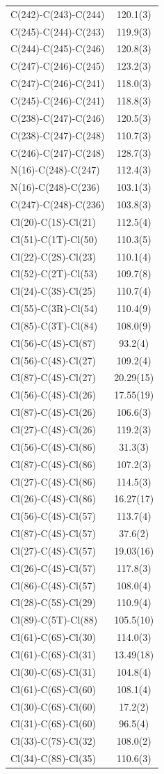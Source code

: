 \begin{center}
{\begin{supertabular}{p{1.5in}c}
C(242)-C(243)-C(244)&120.1(3)\\
C(245)-C(244)-C(243)&119.9(3)\\
C(244)-C(245)-C(246)&120.8(3)\\
C(247)-C(246)-C(245)&123.2(3)\\
C(247)-C(246)-C(241)&118.0(3)\\
C(245)-C(246)-C(241)&118.8(3)\\
C(238)-C(247)-C(246)&120.5(3)\\
C(238)-C(247)-C(248)&110.7(3)\\
C(246)-C(247)-C(248)&128.7(3)\\
N(16)-C(248)-C(247)&112.4(3)\\
N(16)-C(248)-C(236)&103.1(3)\\
C(247)-C(248)-C(236)&103.8(3)\\
Cl(20)-C(1S)-Cl(21)&112.5(4)\\
Cl(51)-C(1T)-Cl(50)&110.3(5)\\
Cl(22)-C(2S)-Cl(23)&110.1(4)\\
Cl(52)-C(2T)-Cl(53)&109.7(8)\\
Cl(24)-C(3S)-Cl(25)&110.7(4)\\
Cl(55)-C(3R)-Cl(54)&110.4(9)\\
Cl(85)-C(3T)-Cl(84)&108.0(9)\\
Cl(56)-C(4S)-Cl(87)&93.2(4)\\
Cl(56)-C(4S)-Cl(27)&109.2(4)\\
Cl(87)-C(4S)-Cl(27)&20.29(15)\\
Cl(56)-C(4S)-Cl(26)&17.55(19)\\
Cl(87)-C(4S)-Cl(26)&106.6(3)\\
Cl(27)-C(4S)-Cl(26)&119.2(3)\\
Cl(56)-C(4S)-Cl(86)&31.3(3)\\
Cl(87)-C(4S)-Cl(86)&107.2(3)\\
Cl(27)-C(4S)-Cl(86)&114.5(3)\\
Cl(26)-C(4S)-Cl(86)&16.27(17)\\
Cl(56)-C(4S)-Cl(57)&113.7(4)\\
Cl(87)-C(4S)-Cl(57)&37.6(2)\\
Cl(27)-C(4S)-Cl(57)&19.03(16)\\
Cl(26)-C(4S)-Cl(57)&117.8(3)\\
Cl(86)-C(4S)-Cl(57)&108.0(4)\\
Cl(28)-C(5S)-Cl(29)&110.9(4)\\
Cl(89)-C(5T)-Cl(88)&105.5(10)\\
Cl(61)-C(6S)-Cl(30)&114.0(3)\\
Cl(61)-C(6S)-Cl(31)&13.49(18)\\
Cl(30)-C(6S)-Cl(31)&104.8(4)\\
Cl(61)-C(6S)-Cl(60)&108.1(4)\\
Cl(30)-C(6S)-Cl(60)&17.2(2)\\
Cl(31)-C(6S)-Cl(60)&96.5(4)\\
Cl(33)-C(7S)-Cl(32)&108.0(2)\\
Cl(34)-C(8S)-Cl(35)&110.6(3)\\
\end{supertabular}
}
\end{center}

